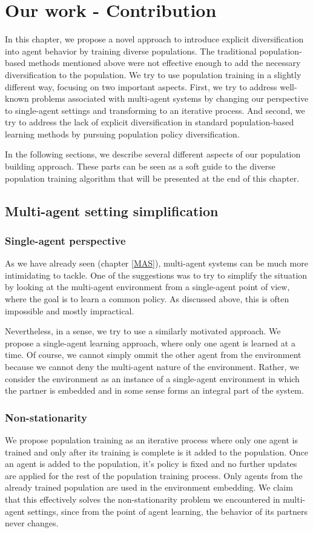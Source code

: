 \chapter{Our work - Contribution}
In this chapter, we propose a novel approach to introduce explicit diversification into agent behavior by training diverse populations.
The traditional population-based methods mentioned above were not effective enough to add the necessary diversification to the population.
We try to use population training in a slightly different way, focusing on two important aspects.
First, we try to address well-known problems associated with multi-agent systems by changing our perspective to single-agent settings and transforming to an iterative process.
And second, we try to address the lack of explicit diversification in standard population-based learning methods by pursuing population policy diversification.

In the following sections, we describe several different aspects of our population building approach.
These parts can be seen as a soft guide to the diverse population training algorithm that will be presented at the end of this chapter.

\section{Multi-agent setting simplification}

\subsection{Single-agent perspective}
As we have already seen (chapter \ref{MAS}), multi-agent systems can be much more intimidating to tackle.
One of the suggestions was to try to simplify the situation by looking at the multi-agent environment from a single-agent point of view, where the goal is to learn a common policy.
As discussed above, this is often impossible and mostly impractical.

Nevertheless, in a sense, we try to use a similarly motivated approach.
We propose a single-agent learning approach, where only one agent is learned at a time.
Of course, we cannot simply ommit the other agent from the environment because we cannot deny the multi-agent nature of the environment.
Rather, we consider the environment as an instance of a single-agent environment in which the partner is embedded and in some sense forms an integral part of the system.

\subsection{Non-stationarity}
We propose population training as an iterative process where only one agent is trained and only after its training is complete is it added to the population.
Once an agent is added to the population, it's policy is fixed and no further updates are applied for the rest of the population training process.
Only agents from the already trained population are used in the environment embedding.
We claim that this effectively solves the non-stationarity problem we encountered in multi-agent settings, since from the point of agent learning, the behavior of its partners never changes.

